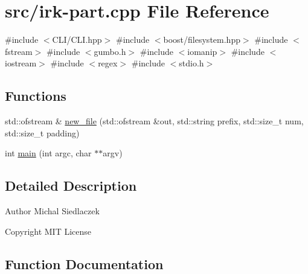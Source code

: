 \hypertarget{irk-part_8cpp}{}\section{src/irk-\/part.cpp File Reference}
\label{irk-part_8cpp}
{\ttfamily \#include $<$C\+L\+I/\+C\+L\+I.\+hpp$>$}\newline
{\ttfamily \#include $<$boost/filesystem.\+hpp$>$}\newline
{\ttfamily \#include $<$fstream$>$}\newline
{\ttfamily \#include $<$gumbo.\+h$>$}\newline
{\ttfamily \#include $<$iomanip$>$}\newline
{\ttfamily \#include $<$iostream$>$}\newline
{\ttfamily \#include $<$regex$>$}\newline
{\ttfamily \#include $<$stdio.\+h$>$}\newline
\subsection*{Functions}
\begin{DoxyCompactItemize}
\item 
std\+::ofstream \& \mbox{\hyperlink{irk-part_8cpp_ac847d7f963015a5fe6bcc99b24a2f5b4}{new\+\_\+file}} (std\+::ofstream \&out, std\+::string prefix, std\+::size\+\_\+t num, std\+::size\+\_\+t padding)
\item 
int \mbox{\hyperlink{irk-part_8cpp_a3c04138a5bfe5d72780bb7e82a18e627}{main}} (int argc, char $\ast$$\ast$argv)
\end{DoxyCompactItemize}


\subsection{Detailed Description}
\begin{DoxyAuthor}{Author}
Michal Siedlaczek 
\end{DoxyAuthor}
\begin{DoxyCopyright}{Copyright}
M\+IT License 
\end{DoxyCopyright}


\subsection{Function Documentation}
\mbox{\label{irk-part_8cpp_a3c04138a5bfe5d72780bb7e82a18e627}} 
